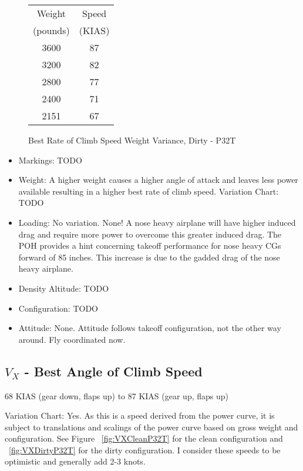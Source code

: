 \begin{figure}
\begin{center}
\begin{tabular}{ |c|c| }
    \hline
    Weight & Speed \\
    (pounds) & (KIAS) \\
    \hline
     3600 &  87 \\
     3200 &  82 \\
    \hline
     2800 &  77 \\
     2400 &  71 \\
    \hline
     2151 &  67 \\
    \hline
\end{tabular}
\end{center}
\caption{Best Rate of Climb Speed Weight Variance, Dirty - P32T}
\label{fig:VYDirtyP32T}
\end{figure}

\begin{itemize}
\item Markings: TODO
\item Weight: A higher weight causes a higher angle of attack and leaves less power available resulting in a higher best rate of climb speed.
Variation Chart: TODO
\item Loading: No variation. None! A nose heavy airplane will have higher induced drag and require more power to overcome this greater induced drag.
The POH provides a hint concerning takeoff performance for nose heavy CGs forward of 85 inches. This increase is due to the gadded drag of the nose heavy airplane.
\item Density Altitude: TODO
\item Configuration: TODO
\item Attitude: None. Attitude follows takeoff configuration, not the other way around. Fly coordinated now.
\end{itemize}

\subsection{$V_X$ - Best Angle of Climb Speed}

68 KIAS (gear down, flaps up) to 87 KIAS (gear up, flaps up)

Variation Chart: Yes. As this is a speed derived from the power curve, it is subject to translations and scalings of the power curve based on gross weight and configuration. See Figure ~\ref{fig:VXCleanP32T} for the clean configuration and ~\ref{fig:VXDirtyP32T} for the dirty configuration. I consider these speeds to be optimistic and generally add 2-3 knots.

